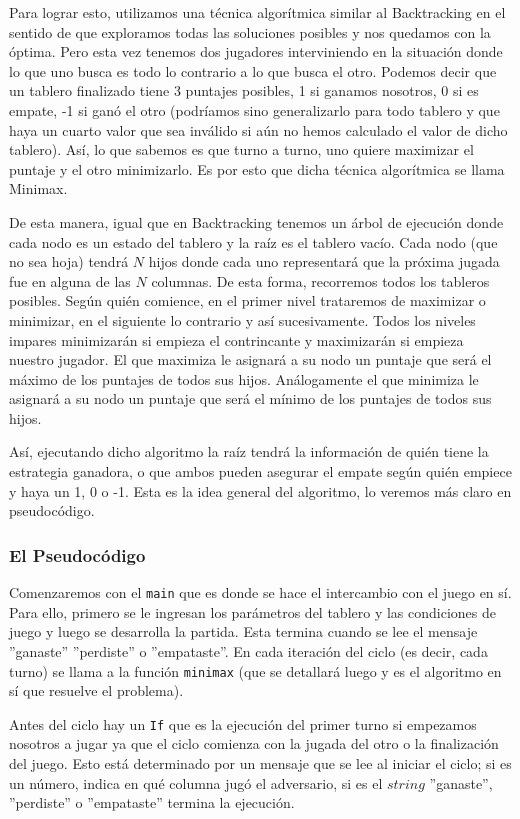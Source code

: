 \documentclass[A4paper,oneside,fleqn,11pt]{article}
\theoremstyle{definition}
\begin{document}
Para lograr esto, utilizamos una técnica algorítmica similar al Backtracking en el sentido de que exploramos todas las soluciones posibles y nos quedamos con la óptima. Pero esta vez tenemos dos jugadores interviniendo en la situación donde lo que uno busca es todo lo contrario a lo que busca el otro. Podemos decir que un tablero finalizado tiene 3 puntajes posibles, 1 si ganamos nosotros, 0 si es empate, -1 si ganó el otro (podríamos sino generalizarlo para todo tablero y que haya un cuarto valor que sea inválido si aún no hemos calculado el valor de dicho tablero). Así, lo que sabemos es que turno a turno, uno quiere maximizar el puntaje y el otro minimizarlo. Es por esto que dicha técnica algorítmica se llama Minimax. 

De esta manera, igual que en Backtracking tenemos un árbol de ejecución donde cada nodo es un estado del tablero y la raíz es el tablero vacío. Cada nodo (que no sea hoja) tendrá $N$ hijos donde cada uno representará que la próxima jugada fue en alguna de las $N$ columnas. De esta forma, recorremos todos los tableros posibles. Según quién comience, en el primer nivel trataremos de maximizar o minimizar, en el siguiente lo contrario y así sucesivamente. Todos los niveles impares minimizarán si empieza el contrincante y maximizarán si empieza nuestro jugador. El que maximiza le asignará a su nodo un puntaje que será el máximo de los puntajes de todos sus hijos. Análogamente el que minimiza le asignará a su nodo un puntaje que será el mínimo de los puntajes de todos sus hijos.

Así, ejecutando dicho algoritmo la raíz tendrá la información de quién tiene la estrategia ganadora, o que ambos pueden asegurar el empate según quién empiece y haya un 1, 0 o -1. Esta es la idea general del algoritmo, lo veremos más claro en pseudocódigo.

\subsubsection{El Pseudocódigo}
Comenzaremos con el \texttt{main} que es donde se hace el intercambio con el juego en sí. Para ello, primero se le ingresan los parámetros del tablero y las condiciones de juego y luego se desarrolla la partida. Esta termina cuando se lee el mensaje ''ganaste'' ''perdiste'' o ''empataste''. En cada iteración del ciclo (es decir, cada turno) se llama a la función \texttt{minimax} (que se detallará luego y es el algoritmo en sí que resuelve el problema).

Antes del ciclo hay un \texttt{If} que es la ejecución del primer turno si empezamos nosotros a jugar ya que el ciclo comienza con la jugada del otro o la finalización del juego. Esto está determinado por un mensaje que se lee al iniciar el ciclo; si es un número, indica en qué columna jugó el adversario, si es el $string$ ''ganaste'', ''perdiste'' o ''empataste'' termina la ejecución.
\end{document}
